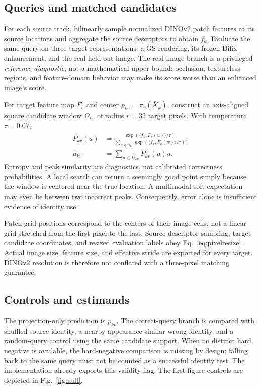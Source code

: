 \documentclass[10pt,twocolumn,letterpaper]{article}
\begin{document}
\subsection{Queries and matched candidates}
For each source track, bilinearly sample normalized DINOv2 patch features at its source locations and aggregate the source descriptors to obtain $f_k$. Evaluate the same query on three target representations: a GS rendering, its frozen Difix enhancement, and the real held-out image. The real-image branch is a privileged \emph{reference diagnostic}, not a mathematical upper bound: occlusion, textureless regions, and feature-domain behavior may make its score worse than an enhanced image's score.

For target feature map $F_v$ and center $p_{kv}=\pi_v(\bar X_k)$, construct an axis-aligned square candidate window $\Omega_{kv}$ of radius $r=32$ target pixels. With temperature $\tau=0.07$,
\begin{align}
P_{kv}(u)&=\frac{\exp(\langle f_k,F_v(u)\rangle/\tau)}{\sum_{w\in\Omega_{kv}}\exp(\langle f_k,F_v(w)\rangle/\tau)},\\
\widehat u_{kv}&=\sum_{u\in\Omega_{kv}}P_{kv}(u)u.
\label{eq:match}
\end{align}
Entropy and peak similarity are diagnostics, not calibrated correctness probabilities. A local search can return a seemingly good point simply because the window is centered near the true location. A multimodal soft expectation may even lie between two incorrect peaks. Consequently, error alone is insufficient evidence of identity use.

Patch-grid positions correspond to the centers of their image cells, not a linear grid stretched from the first pixel to the last. Source descriptor sampling, target candidate coordinates, and resized evaluation labels obey Eq.~\eqref{eq:pixelresize}. Actual image size, feature size, and effective stride are exported for every target. DINOv2 resolution is therefore not conflated with a three-pixel matching guarantee.

\subsection{Controls and estimands}
The projection-only prediction is $p_{kv}$. The correct-query branch is compared with shuffled source identity, a nearby appearance-similar wrong identity, and a random-query control using the same candidate support. When no distinct hard negative is available, the hard-negative comparison is missing by design; falling back to the same query must not be counted as a successful identity test. The implementation already exports this validity flag. The first figure controls are depicted in Fig.~\ref{fig:null}.
\end{document}
